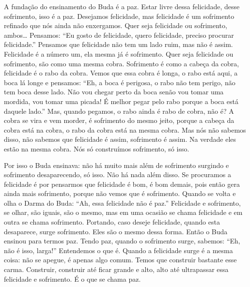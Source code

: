 A fundação do ensinamento do Buda é a paz. Estar livre dessa
felicidade, desse sofrimento, isso é a paz. Desejamos felicidade, mas
felicidade é um sofrimento refinado que nós ainda não enxergamos. Quer
seja felicidade ou sofrimento, ambos… Pensamos: “Eu gosto de
felicidade, quero felicidade, preciso procurar felicidade.” Pensamos
que felicidade não tem um lado ruim, mas não é assim. Felicidade é a
número um, ela mesma já é sofrimento. Quer seja felicidade ou
sofrimento, são como uma mesma cobra. Sofrimento é como a cabeça da
cobra, felicidade é o rabo da cobra. Vemos que essa cobra é longa, o
rabo está aqui, a boca lá longe e pensamos: “Eh, a boca é perigosa, o
rabo não tem perigo, não tem boca desse lado. Não vou chegar perto da
boca senão vou tomar uma mordida, vou tomar uma picada! É melhor pegar
pelo rabo porque a boca está daquele lado.” Mas, quando pegamos, o rabo
ainda é rabo de cobra, não é? A cobra se vira e vem morder, é
sofrimento do mesmo jeito, porque a cabeça da cobra está na cobra, o
rabo da cobra está na mesma cobra. Mas nós não sabemos disso, não
sabemos que felicidade é assim, sofrimento é assim. Na verdade eles
estão na mesma cobra. Nós só construímos sofrimento, só isso. 

Por isso o Buda ensinava: não há muito mais além de sofrimento
surgindo e sofrimento desaparecendo, só isso. Não há nada além disso.
Se procuramos a felicidade é por pensarmos que felicidade é bom, é bom
demais, pois então gera ainda mais sofrimento, porque não vemos que é
sofrimento. Quando se volta e olha o Darma do Buda: “Ah, essa
felicidade não é paz.” Felicidade e sofrimento, se olhar, são iguais,
são o mesmo, mas em uma ocasião se chama felicidade e em outra se chama
sofrimento. Portando, caso deseje felicidade, quando esta desaparece,
surge sofrimento. Eles são o mesmo dessa forma. Então o Buda ensinou
para termos paz. Tendo paz, quando o sofrimento surge, sabemos: “Eh,
não é isso, larga!” Entendemos o que é.
Quando a felicidade surge é a mesma coisa: não se apegue, é apenas algo
comum. Temos que construir bastante esse carma. Construir, construir
até ficar grande e alto, alto até ultrapassar essa felicidade e
sofrimento. É o que se chama paz. 

